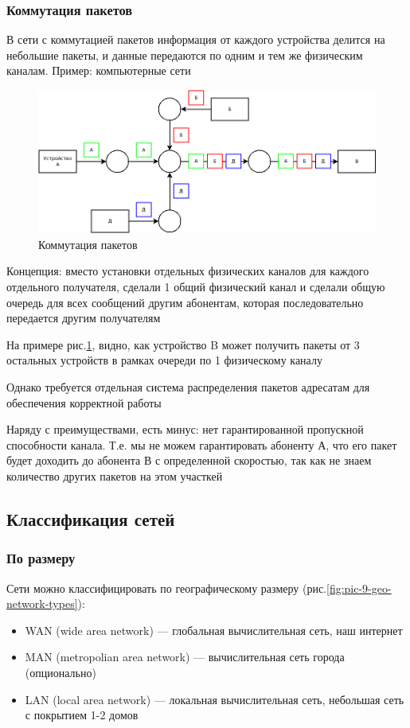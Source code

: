 \documentclass[a4paper]{article}
\begin{document}
\subsubsection{Коммутация пакетов}
В сети с коммутацией пакетов информация от каждого устройства делится на небольшие пакеты, и данные передаются по одним и тем же физическим каналам. Пример: компьютерные сети

\begin{figure}[!h]
	\centering
	\includegraphics[width=\textwidth]{8-package-commutation.png}
	\caption{Коммутация пакетов}
	\label{fig:pic-8-package-commutation}
\end{figure}

Концепция: вместо установки отдельных физических каналов для каждого отдельного получателя, сделали 1 общий физический канал и сделали общую очередь для всех сообщений другим абонентам, которая последовательно передается другим получателям

На примере рис.\ref{fig:pic-8-package-commutation}, видно, как устройство B может получить пакеты от 3 остальных устройств в рамках очереди по 1 физическому каналу

Однако требуется отдельная система распределения пакетов адресатам для обеспечения корректной работы

Наряду с преимуществами, есть минус: нет гарантированной пропускной способности канала. Т.е. мы не можем гарантировать абоненту А, что его пакет будет доходить до абонента В с определенной скоростью, так как не знаем количество других пакетов на этом участкей

\subsection{Классификация сетей}
\subsubsection{По размеру}
Сети можно классифицировать по географическому размеру (рис.\ref{fig:pic-9-geo-network-types}):
\begin{itemize}
	\item WAN (wide area network) --- глобальная вычислительная сеть, наш интернет
	\item MAN (metropolian area network) --- вычислительная сеть города (опционально)
	\item LAN (local area network) --- локальная вычислительная сеть, небольшая сеть с покрытием 1-2 домов
\end{itemize}
\end{document}
